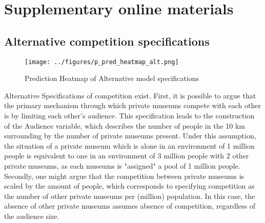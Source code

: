 \documentclass[12pt]{article}
\author{Johannes Aengenheyster}
\date{\today}
\title{}
\begin{document}
\section*{Supplementary online materials}
\label{sec:orgb29274c}


\subsection*{Alternative competition specifications}
\label{sec:org52f01e9}


\begin{figure}[htbp]
\centering
\texttt{[image: ../figures/p\_pred\_heatmap\_alt.png]}
\caption{\label{fig:p_pred_heatmap_alt}Prediction Heatmap of Alternative model specifications}
\end{figure}


Alternative Specifications of competition exist.
First, it is possible to argue that the primary mechanism through which private museums compete with each other is by limiting each other's audience.
This specification leads to the construction of the Audience variable, which describes the number of people in the 10 km surrounding by the number of private museums present.
Under this assumption, the situation of a private museum which is alone in an environment of 1 million people is equivalent to one in an environment of 3 million people with 2 other private museums, as each museums is "assigned" a pool of 1 million people.
Secondly, one might argue that the competition between private museums is scaled by the amount of people, which corresponds to specifying competition as the number of other private museums per (million) population.
In this case, the absence of other private museums assumes absence of competition, regardless of the audience size.
\end{document}
